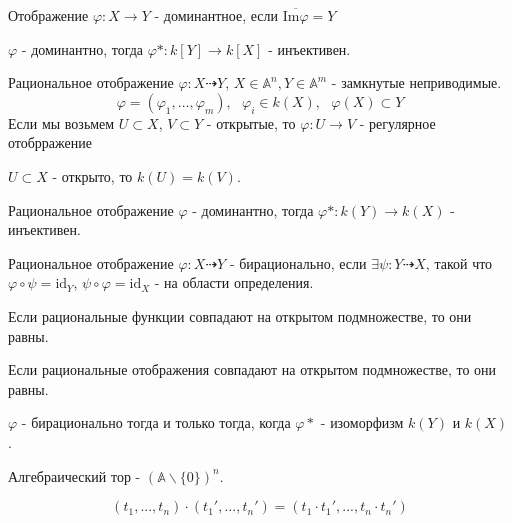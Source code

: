 \documentclass{article}
\begin{document}
\begin{definition}
    Отображение $\varphi : X \to Y$ - доминантное, если $\overline{\text{Im} \varphi} = Y$
\end{definition}

\begin{theorem}
    $\varphi$ - доминантно, тогда $\varphi * : k[Y] \to k[X]$ - инъективен.
\end{theorem}

\begin{definition}
    Рациональное отображение $\varphi : X \dashrightarrow Y$, $X \in \mathbb{A}^n, Y \in \mathbb{A}^m$ - замкнутые неприводимые. 
    $$\varphi = (\varphi_1, ..., \varphi_m), \ \ \ \varphi_i \in k(X), \ \ \ \varphi(X) \subset Y$$
    Если мы возьмем $U \subset X$, $V \subset Y$ - открытые, то $\varphi : U \to V$ - регулярное отобрражение
\end{definition}

\begin{theorem}
    $U \subset X$ - открыто, то $k(U) = k(V)$.
\end{theorem}

\begin{theorem}
    Рациональное отображение $\varphi$ - доминантно, тогда $\varphi * : k(Y) \to k(X)$ - инъективен.
\end{theorem}

\begin{definition}
    Рациональное отображение $\varphi : X \dashrightarrow Y$ - бирационально,
    если $\exists \psi : Y \dashrightarrow X$, такой что $\varphi \circ \psi = \text{id}_Y$, $\psi \circ \varphi = \text{id}_X$ - на области определения.
\end{definition}

\begin{theorem}
    Если рациональные функции совпадают на открытом подмножестве, то они равны.
\end{theorem}

\begin{theorem}
     Если рациональные отображения совпадают на открытом подмножестве, то они равны.
\end{theorem}

\begin{theorem}
    $\varphi$ - бирационально тогда и только тогда, когда $\varphi *$ - изоморфизм $k(Y)$ и $k(X)$.
\end{theorem}

\begin{definition}
    Алгебраический тор - $(\mathbb{A} \backslash \{0\})^n$.

    $$(t_1, ..., t_n) \cdot (t_1', ..., t_n') = (t_1 \cdot t_1', ..., t_n \cdot t_n')$$
\end{definition}
\end{document}
